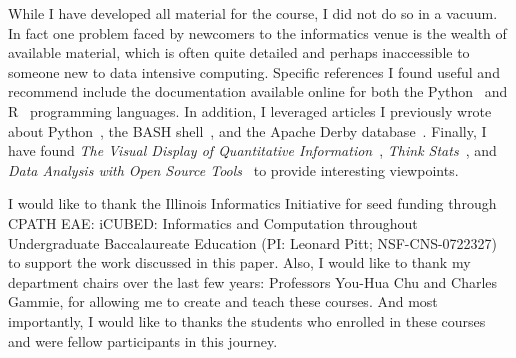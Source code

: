 While I have developed all material for the course, I did not do so in a vacuum. In fact one problem faced by newcomers to the informatics venue is the wealth of available material, which is often quite detailed and perhaps inaccessible to someone new to data intensive computing. Specific references I found useful and recommend include the documentation available online for both the Python~\citep{python} and R~\citep{rproject} programming languages. In addition, I leveraged articles I previously wrote about Python~\citep{rjbpython}, the BASH shell~\citep{rjbbash}, and the Apache Derby database~\citep{rjbderby}. Finally, I have found {\em The Visual Display of Quantitative Information}~\citep{tufte09}, {\em Think Stats}~\citep{downey11}, and {\em Data Analysis with Open Source Tools}~\citep{janert10} to provide interesting viewpoints. 

\acknowledgements I would like to thank the Illinois Informatics Initiative for seed funding through CPATH EAE: iCUBED: Informatics and Computation throughout Undergraduate Baccalaureate Education (PI: Leonard Pitt; NSF-CNS-0722327) to support the work discussed in this paper. Also, I would like to thank my department chairs over the last few years: Professors You-Hua Chu and Charles Gammie, for allowing me to create and teach these courses. And most importantly, I would like to thanks the students who enrolled in these courses and were fellow participants in this journey.




